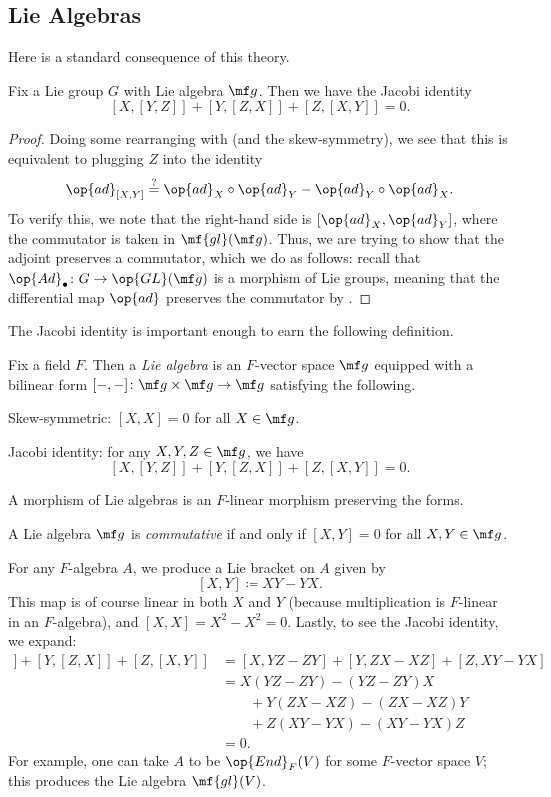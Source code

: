 \documentclass[../notes.tex]{subfiles}
\begin{document}
\subsection{Lie Algebras}
Here is a standard consequence of this theory.
\begin{proposition} \label{prop:jacobi}
	Fix a Lie group $G$ with Lie algebra $\mf g$. Then we have the Jacobi identity
	\[[X,[Y,Z]]+[Y,[Z,X]]+[Z,[X,Y]]=0.\]
\end{proposition}
\begin{proof}
	Doing some rearranging with  (and the skew-symmetry), we see that this is equivalent to plugging $Z$ into the identity
	\[{\op{ad}_{[X,Y]}}\stackrel?={\op{ad}_X}\circ{\op{ad}_Y}-{\op{ad}_Y}\circ{\op{ad}_X}.\]
	To verify this, we note that the right-hand side is $[{\op{ad}_X},{\op{ad}_Y}]$, where the commutator is taken in $\mf{gl}(\mf g)$. Thus, we are trying to show that the adjoint preserves a commutator, which we do as follows: recall that $\op{Ad}_\bullet\colon G\to\op{GL}(\mf g)$ is a morphism of Lie groups, meaning that the differential map $\op{ad}$ preserves the commutator by .
\end{proof}
The Jacobi identity is important enough to earn the following definition.
\begin{definition}
	Fix a field $F$. Then a \textit{Lie algebra} is an $F$-vector space $\mf g$ equipped with a bilinear form $[-,-]\colon\mf g\times\mf g\to\mf g$ satisfying the following.
	\begin{listalph}
		\item Skew-symmetric: $[X,X]=0$ for all $X\in\mf g$.
		\item Jacobi identity: for any $X,Y,Z\in\mf g$, we have
		\[[X,[Y,Z]]+[Y,[Z,X]]+[Z,[X,Y]]=0.\]
	\end{listalph}
	A morphism of Lie algebras is an $F$-linear morphism preserving the forms.
\end{definition}
\begin{definition}[commutative]
	A Lie algebra $\mf g$ is \textit{commutative} if and only if $[X,Y]=0$ for all $X,Y\in\mf g$.
\end{definition}
\begin{example}
	For any $F$-algebra $A$, we produce a Lie bracket on $A$ given by
	\[[X,Y]\coloneqq XY-YX.\]
	This map is of course linear in both $X$ and $Y$ (because multiplication is $F$-linear in an $F$-algebra), and $[X,X]=X^2-X^2=0$. Lastly, to see the Jacobi identity, we expand:
	\begin{align*}
		[X,[Y,Z]]+[Y,[Z,X]]+[Z,[X,Y]] &= [X,YZ-ZY]+[Y,ZX-XZ]+[Z,XY-YX] \\
		&= X(YZ-ZY)-(YZ-ZY)X \\
		&\qquad+Y(ZX-XZ)-(ZX-XZ)Y \\
		&\qquad+Z(XY-YX)-(XY-YX)Z \\
		&= 0.
	\end{align*}
	For example, one can take $A$ to be $\op{End}_F(V)$ for some $F$-vector space $V$; this produces the Lie algebra $\mf{gl}(V)$.
\end{example}
\end{document}
